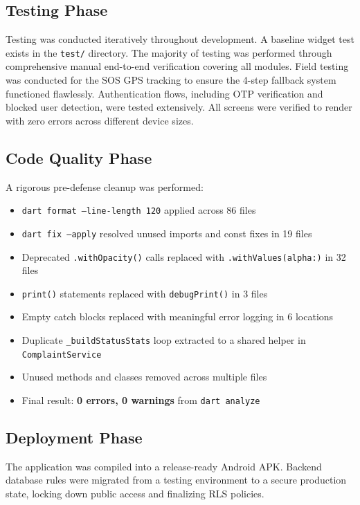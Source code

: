 \documentclass[12pt, a4paper, twoside, openany]{report}
\begin{document}
\subsection{Testing Phase}
Testing was conducted iteratively throughout development. A baseline widget test exists in the \texttt{test/} directory. The majority of testing was performed through comprehensive manual end-to-end verification covering all modules. Field testing was conducted for the SOS GPS tracking to ensure the 4-step fallback system functioned flawlessly. Authentication flows, including OTP verification and blocked user detection, were tested extensively. All screens were verified to render with zero errors across different device sizes.

\subsection{Code Quality Phase}
A rigorous pre-defense cleanup was performed:
\begin{itemize}
    \item \texttt{dart format --line-length 120} applied across 86 files
    \item \texttt{dart fix --apply} resolved unused imports and const fixes in 19 files
    \item Deprecated \texttt{.withOpacity()} calls replaced with \texttt{.withValues(alpha:)} in 32 files
    \item \texttt{print()} statements replaced with \texttt{debugPrint()} in 3 files
    \item Empty catch blocks replaced with meaningful error logging in 6 locations
    \item Duplicate \texttt{\_buildStatusStats} loop extracted to a shared helper in \texttt{ComplaintService}
    \item Unused methods and classes removed across multiple files
    \item Final result: \textbf{0 errors, 0 warnings} from \texttt{dart analyze}
\end{itemize}

\subsection{Deployment Phase}
The application was compiled into a release-ready Android APK. Backend database rules were migrated from a testing environment to a secure production state, locking down public access and finalizing RLS policies.
\end{document}

